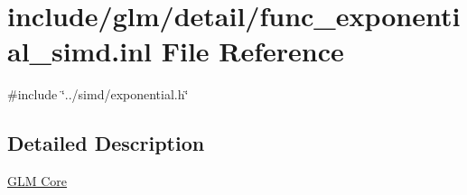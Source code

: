 \hypertarget{func__exponential__simd_8inl}{}\section{include/glm/detail/func\+\_\+exponential\+\_\+simd.inl File Reference}
\label{func__exponential__simd_8inl}
{\ttfamily \#include \char`\"{}../simd/exponential.\+h\char`\"{}}\newline


\subsection{Detailed Description}
\hyperlink{group__core}{G\+LM Core} 